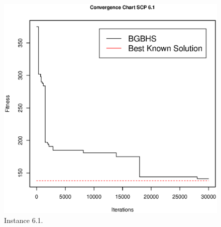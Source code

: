 \begin{figure}[]
\centering
\includegraphics[scale=.45]{Resultados/scp61.eps}
\caption{Instance 6.1.}
\label{fig:Instance.6.1}
\end{figure}
